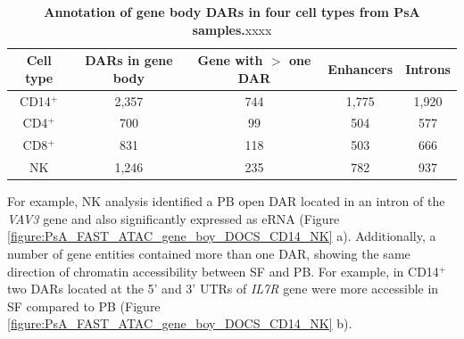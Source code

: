 \begin{table}[htbp]
\centering
\begin{tabular}{@{} c c c c c}
\toprule
\textbf{Cell type} & \textbf{DARs in gene body} &  \textbf{Gene with $>$ one DAR} &\textbf{Enhancers} & \textbf{Introns} \\
\midrule
\midrule
CD14$^+$ & 2,357 & 744 & 1,775 & 1,920 \\
CD4$^+$ & 700 & 99 & 504 & 577 \\
CD8$^+$ & 831 & 118 & 503 & 666 \\
NK   & 1,246 & 235 & 782 & 937 \\   
\bottomrule
\end{tabular}
\medskip %
\caption[Annotation of gene body DARs in four cell types from PsA samples.]{\textbf{Annotation of gene body DARs in four cell types from PsA samples.}xxxx}
\label{tab:PSA_DOCs_gene_body}
\end{table}

For example, NK analysis identified a PB open DAR located in an intron of the \textit{VAV3} gene and also significantly expressed as eRNA (Figure \ref{figure:PsA_FAST_ATAC_gene_boy_DOCS_CD14_NK} a). Additionally, a number of gene entities contained more than one DAR, showing the same direction of chromatin accessibility between SF and PB. For example, in CD14$^+$ two DARs located at the 5' and 3' UTRs of \textit{IL7R} gene were more accessible in SF compared to PB (Figure \ref{figure:PsA_FAST_ATAC_gene_boy_DOCS_CD14_NK} b). 

